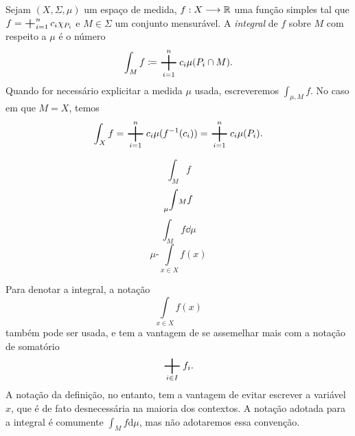 \begin{defi}
Sejam $(X,\Sigma,\mu)$ um espaço de medida, $f : X \longrightarrow \mathbb{R}$ uma função simples tal que $f=\bigplus_{i=1}^n c_i \idc_{P_i}$ e $M \in \Sigma$ um conjunto mensurável. A \emph{integral} de $f$ sobre $M$ com respeito a $\mu$ é o número
	\begin{equation*}
	\int_M f \coloneqq \bigplus_{i=1}^n c_i \mu(P_i \cap M).
	\end{equation*}
Quando for necessário explicitar a medida $\mu$ usada, escreveremos $\displaystyle\int_{\mu,M} f$. No caso em que $M=X$, temos
	\begin{equation*}
	\int_X f = \bigplus_{i=1}^n c_i \mu(f\inv(c_i)) =  \bigplus_{i=1}^n c_i \mu(P_i).
	\end{equation*}
\end{defi}

\newpage

\begin{equation*}
\int_M f
\end{equation*}
\begin{equation*}
\prescript{}{\mu}\int_M f
\end{equation*}
\begin{equation*}
\int_M f \dd \mu
\end{equation*}
\begin{equation*}
\mu\text{-}\int\limits_{x \in X} f(x)
\end{equation*}




Para denotar a integral, a notação
	\begin{equation*}
	\int\limits_{x \in X} f(x)
	\end{equation*}
também pode ser usada, e tem a vantagem de se assemelhar mais com a notação de somatório
	\begin{equation*}
	\bigplus_{i \in I} f_i.
	\end{equation*}
A notação da definição, no entanto, tem a vantagem de evitar escrever a variável $x$, que é de fato desnecessária na maioria dos contextos. A notação adotada para a integral é comumente $\int_M f \mathrm{d}\mu$, mas não adotaremos essa convenção.


